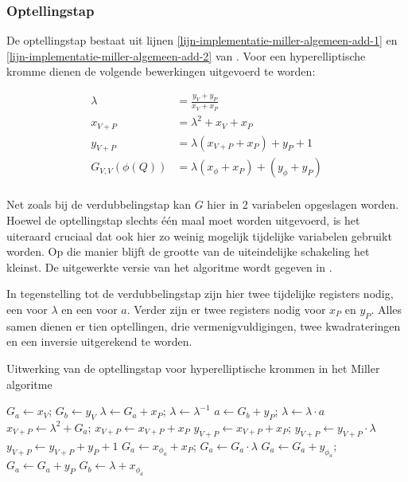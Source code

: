 \subsubsection{Optellingstap}

De optellingstap bestaat uit lijnen \ref{lijn-implementatie-miller-algemeen-add-1} en \ref{lijn-implementatie-miller-algemeen-add-2} van . Voor een hyperelliptische kromme dienen de volgende bewerkingen uitgevoerd te worden\cite{bertoni}:

\[\begin{aligned}
	\lambda &= \frac{y_V + y_P}{x_V + x_P}\\
	x_{V + P} &= \lambda ^2 + x_V + x_P\\
	y_{V + P} &= \lambda (x_{V+P} + x_P) + y_P + 1\\
	G_{V,V}(\phi(Q)) &= \lambda (x_{\phi} + x_P) + (y_{\phi} + y_P)\\
\end{aligned}\]

Net zoals bij de verdubbelingstap kan $G$ hier in 2 variabelen opgeslagen worden. Hoewel de optellingstap slechts \'e\'en maal moet worden uitgevoerd, is het uiteraard cruciaal dat ook hier zo weinig mogelijk tijdelijke variabelen gebruikt worden. Op die manier blijft de grootte van de uiteindelijke schakeling het kleinst. De uitgewerkte versie van het algoritme wordt gegeven in .

In tegenstelling tot de verdubbelingstap zijn hier twee tijdelijke registers nodig, een voor $\lambda$ en een voor $a$. Verder zijn er twee registers nodig voor $x_P$ en $y_P$. Alles samen dienen er tien optellingen, drie vermenigvuldigingen, twee kwadrateringen en een inversie uitgerekend te worden.

\begin{algorithm}[h]
	\caption{Uitwerking van de optellingstap voor hyperelliptische krommen in het Miller algoritme}
	\label{algoritme-implementatie-miller-add-detail}
	$G_a \leftarrow x_V$; $G_b \leftarrow y_V$\;
	$\lambda \leftarrow G_a + x_P$; $\lambda \leftarrow \lambda^{-1}$\;
	$a \leftarrow G_b + y_P$; $\lambda \leftarrow \lambda \cdot a$\;
	$x_{V + P} \leftarrow \lambda ^2 + G_a$; $x_{V + P} \leftarrow x_{V + P} + x_P$\;
	$y_{V + P} \leftarrow x_{V + P} + x_P$; $y_{V + P} \leftarrow y_{V + P} \cdot \lambda$\;
	$y_{V + P} \leftarrow y_{V + P} + y_P + 1$\;
	$G_a \leftarrow x_{\phi_a} + x_P$; $G_a \leftarrow G_a \cdot \lambda$\;
	$G_a \leftarrow G_a + y_{\phi_a}$; $G_a \leftarrow G_a + y_P$\;
	$G_b \leftarrow \lambda + x_{\phi_a}$\;
\end{algorithm}

